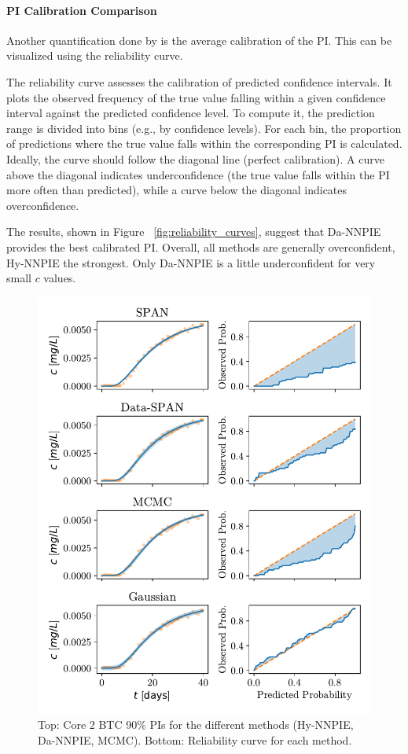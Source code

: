 \paragraph{PI Calibration Comparison}
Another quantification done by \cite{finn} is the average calibration of the PI. This can be visualized using the reliability curve.

The reliability curve assesses the calibration of predicted confidence intervals. It plots the observed frequency of the true value falling within a given confidence interval against the predicted confidence level. To compute it, the prediction range is divided into bins (e.g., by confidence levels). For each bin, the proportion of predictions where the true value falls within the corresponding PI is calculated. Ideally, the curve should follow the diagonal line (perfect calibration). A curve above the diagonal indicates underconfidence (the true value falls within the PI more often than predicted), while a curve below the diagonal indicates overconfidence.

The results, shown in Figure ~\vref{fig:reliability_curves}, suggest that Da-NNPIE provides the best calibrated PI. Overall, all methods are generally overconfident, Hy-NNPIE the strongest. Only Da-NNPIE is a little underconfident for very small $c$ values.

\begin{figure}[h]
    \centering
    \includegraphics{figs/reliability_curves.pdf}
    \caption{Top: Core 2 BTC 90\% PIs for the different methods (Hy-NNPIE, Da-NNPIE, MCMC). Bottom: Reliability curve for each method.}
    \label{fig:reliability_curves}
\end{figure}


